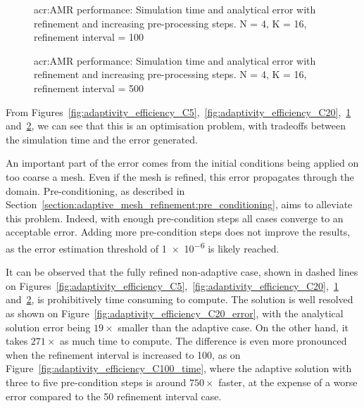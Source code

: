 \begin{figure}[H]
	\centering
	\hfill
	\caption{\Acrlong{acr:AMR} performance: Simulation time and analytical error with refinement and increasing pre-processing steps. N = 4, K = 16, refinement interval = 100}\label{fig:adaptivity_efficiency_C100}
\end{figure}

\begin{figure}[H]
	\centering
	\hfill
	\caption{\Acrlong{acr:AMR} performance: Simulation time and analytical error with refinement and increasing pre-processing steps. N = 4, K = 16, refinement interval = 500}\label{fig:adaptivity_efficiency_C500}
\end{figure}

From
Figures~\ref{fig:adaptivity_efficiency_C5},~\ref{fig:adaptivity_efficiency_C20},~\ref{fig:adaptivity_efficiency_C100}
and~\ref{fig:adaptivity_efficiency_C500}, we can see that this is an optimisation problem, with
tradeoffs between the simulation time and the error generated.

An important part of the error comes from the initial conditions being applied on too coarse a mesh.
Even if the mesh is refined, this error propagates through the domain. Pre-conditioning, as
described in Section~\ref{section:adaptive_mesh_refinement:pre_conditioning}, aims to alleviate this
problem. Indeed, with enough pre-condition steps all cases converge to an acceptable error. Adding
more pre-condition steps does not improve the results, as the error estimation threshold of
\num{1e-6} is likely reached.

It can be observed that the fully refined non-adaptive case, shown in dashed lines on
Figures~\ref{fig:adaptivity_efficiency_C5},~\ref{fig:adaptivity_efficiency_C20},~\ref{fig:adaptivity_efficiency_C100}
and~\ref{fig:adaptivity_efficiency_C500}, is prohibitively time consuming to compute. The solution
is well resolved as shown on Figure~\ref{fig:adaptivity_efficiency_C20_error}, with the analytical
solution error being \(19 \times \) smaller than the adaptive case. On the other hand, it takes
\(271 \times \) as much time to compute. The difference is even more pronounced when the refinement
interval is increased to 100, as on Figure~\ref{fig:adaptivity_efficiency_C100_time}, where the
adaptive solution with three to five pre-condition steps is around \(750 \times \) faster, at the
expense of a worse error compared to the 50 refinement interval case.

